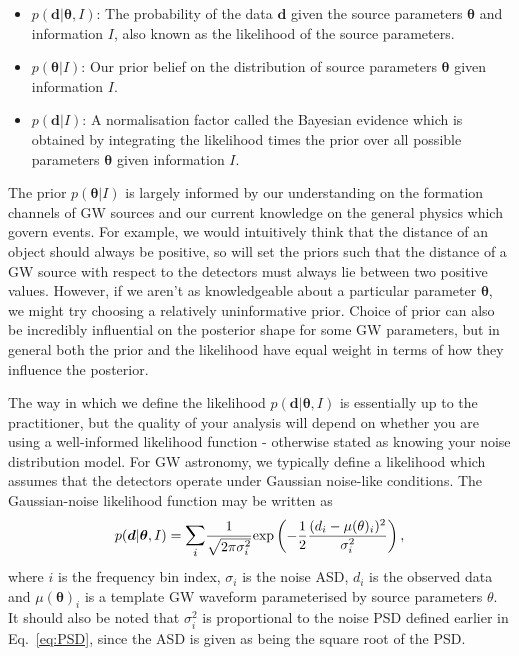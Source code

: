 \begin{itemize}
    \item $p(\bm{d}|\bm{\theta}, I)$: The probability of the data $\bm{d}$ given the source parameters $\bm{\theta}$ 
    and information $I$, also known as the likelihood of the source parameters.
    \item $p(\bm{\theta}|I)$: Our prior belief on the distribution of source parameters $\bm{\theta}$ given information 
    $I$.
    \item $p(\bm{d}|I)$: A normalisation factor called the Bayesian evidence which is obtained by integrating the likelihood times the prior over all possible parameters $\bm{\theta}$ given information $I$.
\end{itemize}

The prior $p(\bm{\theta}|I)$ is largely informed by our understanding 
on the formation channels of \ac{GW} sources and our current knowledge on 
the general physics which govern events. For example, we would 
intuitively think that the distance of an object should always be 
positive, so will set the priors such that the distance of a 
\ac{GW} source with respect to the detectors must always lie 
between two positive values. However, if we aren't as 
knowledgeable about a particular parameter $\bm{\theta}$, we 
might try choosing a relatively uninformative prior. Choice of 
prior can also be incredibly influential on the posterior shape 
for some \ac{GW} parameters\cite{PhysRevLett.119.251103}, 
but in general both the prior and the likelihood have equal weight in terms 
of how they influence the posterior.

%
%
The way in which we define the likelihood 
$p(\bm{d}|\bm{\theta}, I)$ is essentially up to the practitioner, but 
the quality of your analysis will depend on whether 
you are using a well-informed likelihood function 
- otherwise stated as knowing your noise distribution model. 
For \ac{GW} astronomy, we 
typically define a likelihood which assumes that the detectors operate under 
Gaussian noise-like conditions. The Gaussian-noise likelihood 
function may be written as 
%
\begin{equation}
    p(\bm{d}|\bm{\theta}, I) = \mathlarger{\sum_{i}} \frac{1}{\sqrt{2\pi \sigma_i^2}} \textrm{exp}\left(-\frac{1}{2} 
    \frac{(d_i - \mu(\theta)_i)^2}{\sigma_i^2}\right),
\end{equation}
%
where $i$ is the frequency bin index, $\sigma_i$ is the noise 
\ac{ASD}, $d_i$ is the observed data and $\mu(\bm{\theta})_i$ is a 
template \ac{GW} waveform parameterised by source parameters 
$\theta$. It should also be noted 
that $\sigma_{i}^{2}$ is proportional to the noise 
\ac{PSD} defined earlier in  Eq.~\ref{eq:PSD}, 
since the \ac{ASD} is given as being 
the square root of the \ac{PSD}. 

